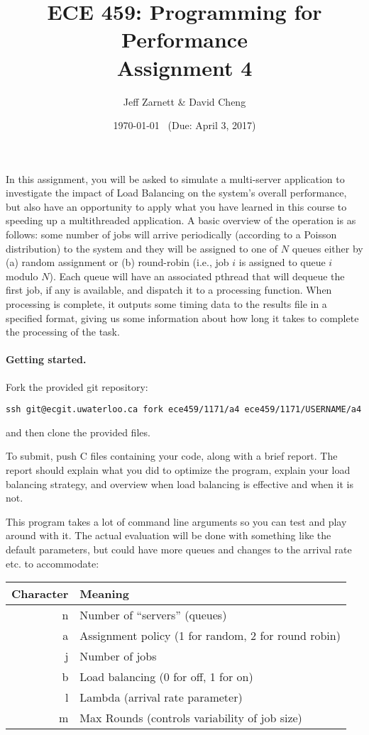 \documentclass[letterpaper,10pt]{article}
\title{\bf ECE 459: Programming for Performance\\Assignment 4}
\author{Jeff Zarnett \& David Cheng}
\date{\today ~ (Due: April 3, 2017)}
\begin{document}
\maketitle

In this assignment, you will be asked to simulate a multi-server application to investigate the impact of Load Balancing on the system's overall performance, but also have an opportunity to apply what you have learned in this course to speeding up a multithreaded application. A basic overview of the operation is as follows: some number of jobs will arrive periodically (according to a Poisson distribution) to the system and they will be assigned to one of $N$ queues either by (a) random assignment or (b) round-robin (i.e., job $i$ is assigned to queue $i$ modulo $N$). Each queue will have an associated pthread that will dequeue the first job, if any is available, and dispatch it to a processing function. When processing is complete, it outputs some timing data to the results file in a specified format, giving us some information about how long it takes to complete the processing of the task.


\paragraph{Getting started.} Fork the provided git repository:
\begin{center}
{\tt ssh git@ecgit.uwaterloo.ca fork ece459/1171/a4 ece459/1171/USERNAME/a4}
\end{center}
\noindent and then clone the provided files.

To submit, push C files containing your code, along with a brief report. The report should explain what you did to optimize the program, explain your load balancing strategy, and overview when load balancing is effective and when it is not.

This program takes a lot of command line arguments so you can test and play around with it. The actual evaluation will be done with something like the default parameters, but could have more queues and changes to the arrival rate etc. to accommodate:

\begin{center}
	\begin{tabular}{r|l}
	\textbf{Character} & \textbf{Meaning} \\ \hline
	n & Number of ``servers'' (queues) \\
	a & Assignment policy (1 for random, 2 for round robin) \\
	j & Number of jobs \\
	b & Load balancing (0 for off, 1 for on) \\
	l & Lambda (arrival rate parameter) \\
	m & Max Rounds (controls variability of job size) \\
	\end{tabular}
\end{center}
\end{document}
